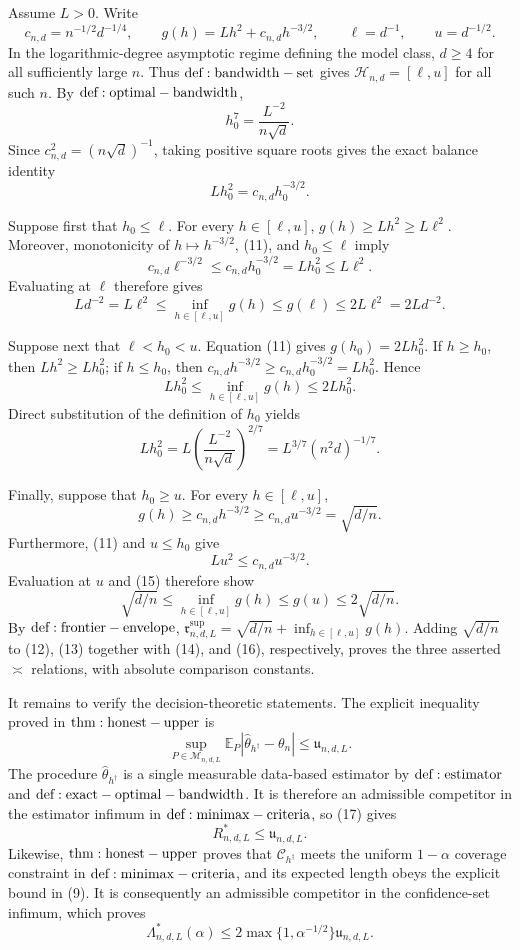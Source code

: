 Assume \(L>0\).  Write
\[
 c_{n,d}=n^{-1/2}d^{-1/4},
 \qquad
 g(h)=Lh^2+c_{n,d}h^{-3/2},
 \qquad
 \ell=d^{-1},
 \qquad
 u=d^{-1/2}.
\tag{10}
\]
In the logarithmic-degree asymptotic regime defining the model class, \(d\geq4\) for all sufficiently large \(n\).  Thus \({\rm def:bandwidth-set}\) gives \(\mathcal H_{n,d}=[\ell,u]\) for all such \(n\).  By \({\rm def:optimal-bandwidth}\),
\[
 h_0^7=\frac{L^{-2}}{n\sqrt d}.
\]
Since \(c_{n,d}^2=(n\sqrt d)^{-1}\), taking positive square roots gives the exact balance identity
\[
 Lh_0^2=c_{n,d}h_0^{-3/2}.
\tag{11}
\]

Suppose first that \(h_0\leq\ell\).  For every \(h\in[\ell,u]\), \(g(h)\geq Lh^2\geq L\ell^2\).  Moreover, monotonicity of \(h\mapsto h^{-3/2}\), (11), and \(h_0\leq\ell\) imply
\[
 c_{n,d}\ell^{-3/2}
 \leq c_{n,d}h_0^{-3/2}
 =Lh_0^2
 \leq L\ell^2.
\]
Evaluating at \(\ell\) therefore gives
\[
 Ld^{-2}=L\ell^2
 \leq\inf_{h\in[\ell,u]}g(h)
 \leq g(\ell)
 \leq2L\ell^2=2Ld^{-2}.
\tag{12}
\]

Suppose next that \(\ell<h_0<u\).  Equation (11) gives \(g(h_0)=2Lh_0^2\).  If \(h\geq h_0\), then \(Lh^2\geq Lh_0^2\); if \(h\leq h_0\), then \(c_{n,d}h^{-3/2}\geq c_{n,d}h_0^{-3/2}=Lh_0^2\).  Hence
\[
 Lh_0^2
 \leq\inf_{h\in[\ell,u]}g(h)
 \leq2Lh_0^2.
\tag{13}
\]
Direct substitution of the definition of \(h_0\) yields
\[
 Lh_0^2
 =L\left(\frac{L^{-2}}{n\sqrt d}\right)^{2/7}
 =L^{3/7}(n^2d)^{-1/7}.
\tag{14}
\]

Finally, suppose that \(h_0\geq u\).  For every \(h\in[\ell,u]\),
\[
 g(h)\geq c_{n,d}h^{-3/2}
 \geq c_{n,d}u^{-3/2}
 =\sqrt{d/n}.
\tag{15}
\]
Furthermore, (11) and \(u\leq h_0\) give
\[
 Lu^2\leq c_{n,d}u^{-3/2}.
\]
Evaluation at \(u\) and (15) therefore show
\[
 \sqrt{d/n}
 \leq\inf_{h\in[\ell,u]}g(h)
 \leq g(u)
 \leq2\sqrt{d/n}.
\tag{16}
\]
By \({\rm def:frontier-envelope}\), \(\mathfrak r^{\mathrm{sup}}_{n,d,L}=\sqrt{d/n}+\inf_{h\in[\ell,u]}g(h)\).  Adding \(\sqrt{d/n}\) to (12), (13) together with (14), and (16), respectively, proves the three asserted \(\asymp\) relations, with absolute comparison constants.

It remains to verify the decision-theoretic statements.  The explicit inequality proved in \({\rm thm:honest-upper}\) is
\[
 \sup_{P\in\mathcal M_{n,d,L}}
 \mathbb E_P|\widehat\theta_{h^\dagger}-\theta_n|
 \leq\mathfrak u_{n,d,L}.
\tag{17}
\]
The procedure \(\widehat\theta_{h^\dagger}\) is a single measurable data-based estimator by \({\rm def:estimator}\) and \({\rm def:exact-optimal-bandwidth}\).  It is therefore an admissible competitor in the estimator infimum in \({\rm def:minimax-criteria}\), so (17) gives
\[
 R^*_{n,d,L}\leq\mathfrak u_{n,d,L}.
\tag{18}
\]
Likewise, \({\rm thm:honest-upper}\) proves that \(\mathcal C_{h^\dagger}\) meets the uniform \(1-\alpha\) coverage constraint in \({\rm def:minimax-criteria}\), and its expected length obeys the explicit bound in (9).  It is consequently an admissible competitor in the confidence-set infimum, which proves
\[
 \Lambda^*_{n,d,L}(\alpha)
 \leq2\max\{1,\alpha^{-1/2}\}\mathfrak u_{n,d,L}.
\tag{19}
\]

